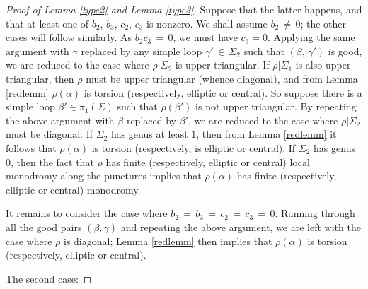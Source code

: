 \documentclass[reqno]{amsart}
\theoremstyle{plain}
\theoremstyle{definition}
\theoremstyle{remark}
\begin{document}
\begin{proof}[Proof of Lemma \ref{type2} and Lemma \ref{type3}]
Suppose that the latter happens, and that at least one of $b_2$, $b_3$, $c_2$, $c_3$ is nonzero. We shall 
assume $b_2\,\neq\,0$; the other cases will follow similarly. As $b_2c_3\,=\,0$, we must have $c_3=0$. Applying the 
same argument with $\gamma$ replaced by any simple loop $\gamma'\,\in\,\Sigma_2$ such that $(\beta,\,\gamma')$ is 
good, we are reduced to the case where $\rho|\Sigma_2$ is upper triangular. If $\rho|\Sigma_1$ is also upper 
triangular, then $\rho$ must be upper triangular (whence diagonal), and from Lemma \ref{redlemm} $\rho(\alpha)$ 
is torsion (respectively, elliptic or central). So suppose there is a simple loop $\beta'\in\pi_1(\Sigma)$ such 
that $\rho(\beta')$ is not upper triangular. By repeating the above argument with $\beta$ replaced by $\beta'$, 
we are reduced to the case where $\rho|\Sigma_2$ must be diagonal. If $\Sigma_2$ has genus at least $1$, then 
from Lemma \ref{redlemm} it follows that $\rho(\alpha)$ is torsion (respectively, is elliptic or central). If 
$\Sigma_2$ has genus $0$, then the fact that $\rho$ has finite (respectively, elliptic or central) local 
monodromy along the punctures implies that $\rho(\alpha)$ has finite (respectively, elliptic or central) 
monodromy.

It remains to consider the case where $b_2\,=\,b_3\,=\,c_2\,=\,c_3\,=\,0$. Running through all the good pairs $(\beta,\gamma)$ 
and repeating the above argument, we are left with the case where $\rho$ is diagonal; Lemma \ref{redlemm} then 
implies that $\rho(\alpha)$ is torsion (respectively, elliptic or central).

The second case:
	

\end{proof}
\end{document}
